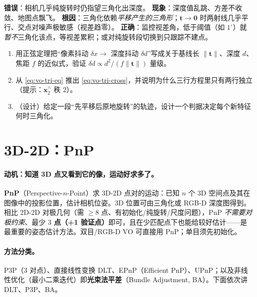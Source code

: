 \begin{pitfall}
\textbf{错误}：相机几乎纯旋转时仍指望三角化出深度。
\textbf{现象}：深度值乱跳、方差不收敛、地图点飘飞。
\textbf{根因}：三角化依赖\emph{平移产生的三角形}；$\mathbf{t}\to\mathbf{0}$ 时两射线几乎平行、交点对噪声极敏感（视差趋零）。
\textbf{正确}：监控视差角，低于阈值（如 $1^\circ$）就\emph{暂不}三角化该点，等视差累积；或对纯旋转段切换到只跟踪不建点。
\end{pitfall}

\begin{practice}
\begin{enumerate}
  \item 用正弦定理把“像素抖动 $\delta x \to$ 深度抖动 $\delta d$”写成关于基线长 $\|\mathbf{t}\|$、深度 $d$、焦距 $f$ 的近似式，验证 $\delta d \propto d^2/(f\|\mathbf{t}\|)$ 量级。
  \item 从 \cref{eq:vo-tri-eq} 推出 \cref{eq:vo-tri-cross}，并说明为什么三行方程里只有两行独立（提示：$\mathbf{x}_2^\wedge$ 秩 $2$）。
  \item （设计）给定一段“先平移后原地旋转”的轨迹，设计一个判据决定每个新特征何时三角化。
\end{enumerate}
\end{practice}

\section{3D-2D：PnP}
\label{sec:vo-pnp}

\paragraph{动机：知道 3D 点又看到它的像，运动好求多了。}\textbf{PnP}（Perspective-$n$-Point）求 3D-2D 点对的运动：已知 $n$ 个 3D 空间点及其在图像中的投影位置，估计相机位姿\cite{gaoxiang2019slam14}。3D 位置可由三角化或 RGB-D 深度图得到。相比 2D-2D 对极几何（需 $\ge8$ 点、有初始化/纯旋转/尺度问题），PnP \emph{不需要对极约束}、最少 \textbf{$3$ 点（+1 验证点）}即可，且在少匹配点下也能给较好估计——是最重要的姿态估计方法。双目/RGB-D VO 可直接用 PnP；单目须先初始化。

\paragraph{方法分类\cite{gaoxiang2019slam14}。}P3P（$3$ 对点）、直接线性变换 DLT、EPnP（Efficient PnP）、UPnP；以及非线性优化（最小二乘迭代）即\textbf{光束法平差}（Bundle Adjustment, BA）。下面依次讲 DLT、P3P、BA。

